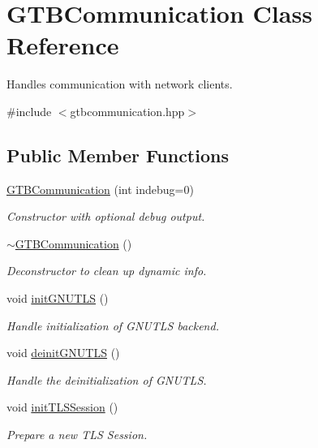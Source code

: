 \hypertarget{classGTBCommunication}{\section{G\-T\-B\-Communication Class Reference}
\label{classGTBCommunication}
}


Handles communication with network clients.  




{\ttfamily \#include $<$gtbcommunication.\-hpp$>$}

\subsection*{Public Member Functions}
\begin{DoxyCompactItemize}
\item 
\hyperlink{classGTBCommunication_ad9935001e2ac8454f6a0846bd3f4c78e}{G\-T\-B\-Communication} (int indebug=0)
\begin{DoxyCompactList}\small\item\em Constructor with optional debug output. \end{DoxyCompactList}\item 
\hyperlink{classGTBCommunication_a9a4c0590a68d27986420d573476857f8}{$\sim$\-G\-T\-B\-Communication} ()
\begin{DoxyCompactList}\small\item\em Deconstructor to clean up dynamic info. \end{DoxyCompactList}\item 
void \hyperlink{classGTBCommunication_ada748d331d99c87beff8f1052e728670}{init\-G\-N\-U\-T\-L\-S} ()
\begin{DoxyCompactList}\small\item\em Handle initialization of G\-N\-U\-T\-L\-S backend. \end{DoxyCompactList}\item 
void \hyperlink{classGTBCommunication_a298abd38038257bf206d22dab7f080f4}{deinit\-G\-N\-U\-T\-L\-S} ()
\begin{DoxyCompactList}\small\item\em Handle the deinitialization of G\-N\-U\-T\-L\-S. \end{DoxyCompactList}\item 
void \hyperlink{classGTBCommunication_a798bd82ec73644b1b7be23431c159993}{init\-T\-L\-S\-Session} ()
\begin{DoxyCompactList}\small\item\em Prepare a new T\-L\-S Session. \end{DoxyCompactList}\item 

\end{DoxyCompactItemize}
